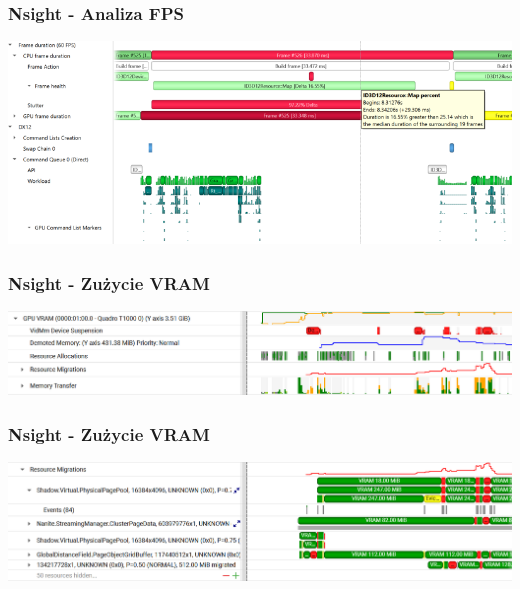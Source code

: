 \documentclass{beamer}
\begin{document}
            \begin{frame}
              \frametitle{Nsight - Analiza FPS}
              \center
                \includegraphics[width=1\textwidth]{dx12_frame_health.png}
                \end{frame}
        

            \begin{frame}
              \frametitle{Nsight - Zużycie VRAM}
              \center
                \includegraphics[width=1\textwidth]{memory_utilization_gpu_vram.png}
                \end{frame}

      \begin{frame}
        \frametitle{Nsight - Zużycie VRAM}
        \center
          \includegraphics[width=1\textwidth]{memory_utilization_resource_migrations.png}
          \end{frame}
\end{document}
